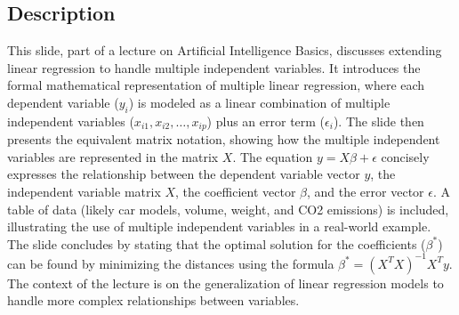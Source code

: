 \documentclass{article}%
\begin{document}
\subsection{Description}%
This slide, part of a lecture on Artificial Intelligence Basics, discusses extending linear regression to handle multiple independent variables.  It introduces the formal mathematical representation of multiple linear regression, where each dependent variable ($y_i$) is modeled as a linear combination of multiple independent variables ($x_{i1}, x_{i2}, \dots, x_{ip}$) plus an error term ($\epsilon_i$).  The slide then presents the equivalent matrix notation, showing how the multiple independent variables are represented in the matrix $X$.  The equation $y = X\beta + \epsilon$ concisely expresses the relationship between the dependent variable vector $y$, the independent variable matrix $X$, the coefficient vector $\beta$, and the error vector $\epsilon$.  A table of data (likely car models, volume, weight, and CO2 emissions) is included, illustrating the use of multiple independent variables in a real-world example.  The slide concludes by stating that the optimal solution for the coefficients ($\beta^*$) can be found by minimizing the distances using the formula $\beta^* = (X^TX)^{-1}X^Ty$. The context of the lecture is on the generalization of linear regression models to handle more complex relationships between variables.%
\end{document}
